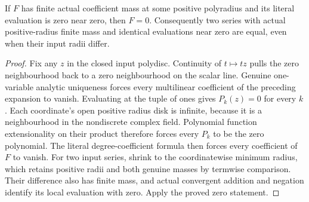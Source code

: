 \begin{theorem}
\label{hir:actual-convergent-evaluation-injective}
\leanok
If $F$ has finite actual coefficient mass at some positive polyradius and
its literal evaluation is zero near zero, then $F=0$. Consequently two
series with actual positive-radius finite mass and identical evaluations
near zero are equal, even when their input radii differ.
\end{theorem}
\begin{proof}
Fix any $z$ in the closed input polydisc. Continuity of $t\mapsto tz$
pulls the zero neighbourhood back to a zero neighbourhood on the scalar
line. Genuine one-variable analytic uniqueness forces every multilinear
coefficient of the preceding expansion to vanish. Evaluating at the tuple
of ones gives $P_k(z)=0$ for every $k$. Each coordinate's open positive
radius disk is infinite, because it is a neighbourhood in the nondiscrete
complex field. Polynomial function extensionality on their product therefore
forces every $P_k$ to be the zero polynomial. The literal degree-coefficient
formula then forces every coefficient of $F$ to vanish. For two input
series, shrink to the coordinatewise minimum radius, which retains positive
radii and both genuine masses by termwise comparison. Their difference
also has finite mass, and actual convergent addition and negation identify
its local evaluation with zero. Apply the proved zero statement.
\end{proof}

